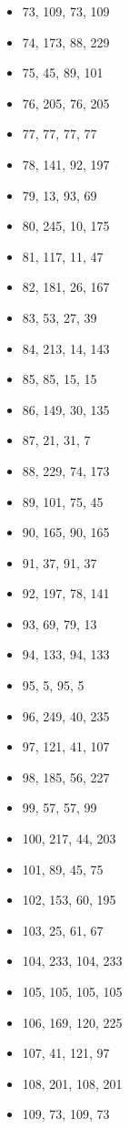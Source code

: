 \documentclass[12pt, fleqn]{report}                             %
\theoremstyle{break}                                            %
\begin{document}
\begin{itemize}
        \item 73, 109, 73, 109
        \item 74, 173, 88, 229
        \item 75, 45, 89, 101
        \item 76, 205, 76, 205
        \item 77, 77, 77, 77
        \item 78, 141, 92, 197
        \item 79, 13, 93, 69
        \item 80, 245, 10, 175
        \item 81, 117, 11, 47
        \item 82, 181, 26, 167
        \item 83, 53, 27, 39
        \item 84, 213, 14, 143
        \item 85, 85, 15, 15
        \item 86, 149, 30, 135
        \item 87, 21, 31, 7
        \item 88, 229, 74, 173
        \item 89, 101, 75, 45
        \item 90, 165, 90, 165
        \item 91, 37, 91, 37
        \item 92, 197, 78, 141
        \item 93, 69, 79, 13
        \item 94, 133, 94, 133
        \item 95, 5, 95, 5
        \item 96, 249, 40, 235
        \item 97, 121, 41, 107
        \item 98, 185, 56, 227
        \item 99, 57, 57, 99
        \item 100, 217, 44, 203
        \item 101, 89, 45, 75
        \item 102, 153, 60, 195
        \item 103, 25, 61, 67
        \item 104, 233, 104, 233
        \item 105, 105, 105, 105
        \item 106, 169, 120, 225
        \item 107, 41, 121, 97
        \item 108, 201, 108, 201
        \item 109, 73, 109, 73

\end{itemize}
\end{document}
